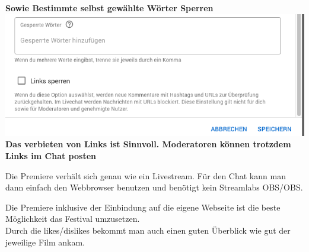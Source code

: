 \begin{center}
  \textbf{Sowie Bestimmte selbst gewählte Wörter Sperren} \\
  {\vspace{0.3cm}}
  \includegraphics[width=\textwidth]{./pictures/premiere11.png}
  \textbf{Das verbieten von Links ist Sinnvoll. Moderatoren können trotzdem Links im Chat posten} \\
\end{center}


Die Premiere verhält sich genau wie ein Livestream. Für den Chat kann man dann einfach den Webbrowser benutzen und benötigt kein Streamlabs OBS/OBS.


Die Premiere inklusive der Einbindung auf die eigene Webseite ist die beste Möglichkeit das Festival umzusetzen. \\
Durch die likes/dislikes bekommt man auch einen guten Überblick wie gut der jeweilige Film ankam.
